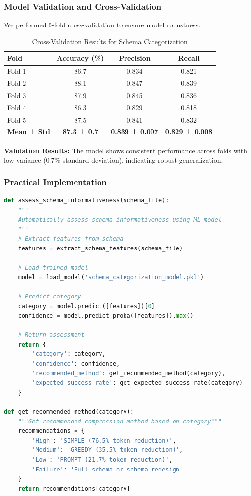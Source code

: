 \subsubsection{Model Validation and Cross-Validation}

We performed 5-fold cross-validation to ensure model robustness:

\begin{table}[H]
\centering
\caption{Cross-Validation Results for Schema Categorization}
\label{tab:cross_validation}
\begin{tabular}{@{}lccc@{}}
\toprule
Fold & Accuracy (\%) & Precision & Recall \\ \midrule
Fold 1 & 86.7 & 0.834 & 0.821 \\
Fold 2 & 88.1 & 0.847 & 0.839 \\
Fold 3 & 87.9 & 0.845 & 0.836 \\
Fold 4 & 86.3 & 0.829 & 0.818 \\
Fold 5 & 87.5 & 0.841 & 0.832 \\
\midrule
\textbf{Mean ± Std} & \textbf{87.3 ± 0.7} & \textbf{0.839 ± 0.007} & \textbf{0.829 ± 0.008} \\ \bottomrule
\end{tabular}
\end{table}

\textbf{Validation Results:} The model shows consistent performance across folds with low variance (0.7\% standard deviation), indicating robust generalization.

\subsubsection{Practical Implementation}

\begin{lstlisting}[language=Python, caption=Schema Assessment Implementation]
def assess_schema_informativeness(schema_file):
    """
    Automatically assess schema informativeness using ML model
    """
    # Extract features from schema
    features = extract_schema_features(schema_file)
    
    # Load trained model
    model = load_model('schema_categorization_model.pkl')
    
    # Predict category
    category = model.predict([features])[0]
    confidence = model.predict_proba([features]).max()
    
    # Return assessment
    return {
        'category': category,
        'confidence': confidence,
        'recommended_method': get_recommended_method(category),
        'expected_success_rate': get_expected_success_rate(category)
    }

def get_recommended_method(category):
    """Get recommended compression method based on category"""
    recommendations = {
        'High': 'SIMPLE (76.5% token reduction)',
        'Medium': 'GREEDY (35.5% token reduction)',
        'Low': 'PROMPT (21.7% token reduction)',
        'Failure': 'Full schema or schema redesign'
    }
    return recommendations[category]
\end{lstlisting}

